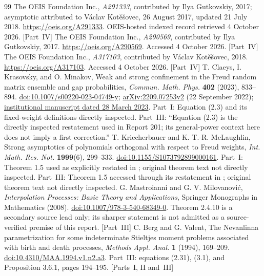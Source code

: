 \documentclass[11pt,letterpaper]{article}
\numberwithin{equation}{section}
\theoremstyle{remark}\newtheorem{remark}[theorem]{Remark}
\begin{document}
\begin{thebibliography}{99}
 The OEIS Foundation Inc., \emph{A291333}, contributed by Ilya Gutkovskiy, 2017; asymptotic attributed to V\'aclav Kot\v e\v sovec, 26 August 2017, updated 21 July 2018. \url{https://oeis.org/A291333}. OEIS-hosted indexed record retrieved 4 October 2026. [Part~IV]
 The OEIS Foundation Inc., \emph{A290569}, contributed by Ilya Gutkovskiy, 2017. \url{https://oeis.org/A290569}. Accessed 4 October 2026. [Part~IV]
 The OEIS Foundation Inc., \emph{A317103}, contributed by V\'aclav Kot\v e\v sovec, 2018. \url{https://oeis.org/A317103}. Accessed 4 October 2026. [Part~IV]
 T. Claeys, I. Krasovsky, and O. Minakov, Weak and strong confinement in the Freud random matrix ensemble and gap probabilities, \emph{Commun. Math. Phys.} \textbf{402} (2023), 833--894. \href{https://doi.org/10.1007/s00220-023-04749-y}{doi:10.1007/s00220-023-04749-y}; \href{https://arxiv.org/abs/2209.07253}{arXiv:2209.07253v2} (22 September 2022); \href{https://research.dial.uclouvain.be/server/api/core/bitstreams/7641b207-65d4-4d81-aa94-cd2289e17a23/content}{institutional manuscript dated 28 March 2023}. Part~I: Equation (2.3) and its fixed-weight definitions directly inspected. Part~III: ``Equation (2.3) is the directly inspected restatement used in Report 201; its general-power context here does not imply a first correction.''
 T. Kriecherbauer and K. T.-R. McLaughlin, Strong asymptotics of polynomials orthogonal with respect to Freud weights, \emph{Int. Math. Res. Not.} \textbf{1999}(6), 299--333. \href{https://doi.org/10.1155/S1073792899000161}{doi:10.1155/S1073792899000161}. Part~I: Theorem 1.5 used as explicitly restated in \cite[Eq. (2.3)]{ckm}; original theorem text not directly inspected. Part~III: Theorem 1.5 accessed through its restatement in \cite[Eq.~(2.3)]{ckm}; original theorem text not directly inspected.
 G. Mastroianni and G. V. Milovanovi\'c, \emph{Interpolation Processes: Basic Theory and Applications}, Springer Monographs in Mathematics (2008). \href{https://doi.org/10.1007/978-3-540-68349-0}{doi:10.1007/978-3-540-68349-0}. Theorem 2.4.10 is a secondary source lead only; its sharper statement is not admitted as a source-verified premise of this report. [Part~III]
 C. Berg and G. Valent, The Nevanlinna parametrization for some indeterminate Stieltjes moment problems associated with birth and death processes, \emph{Methods Appl. Anal.} \textbf{1} (1994), 169--209. \href{https://doi.org/10.4310/MAA.1994.v1.n2.a3}{doi:10.4310/MAA.1994.v1.n2.a3}. Part~III: equations (2.31), (3.1), and Proposition 3.6.1, pages 194--195. [Parts~I, II and~III]

\end{thebibliography}
\end{document}
